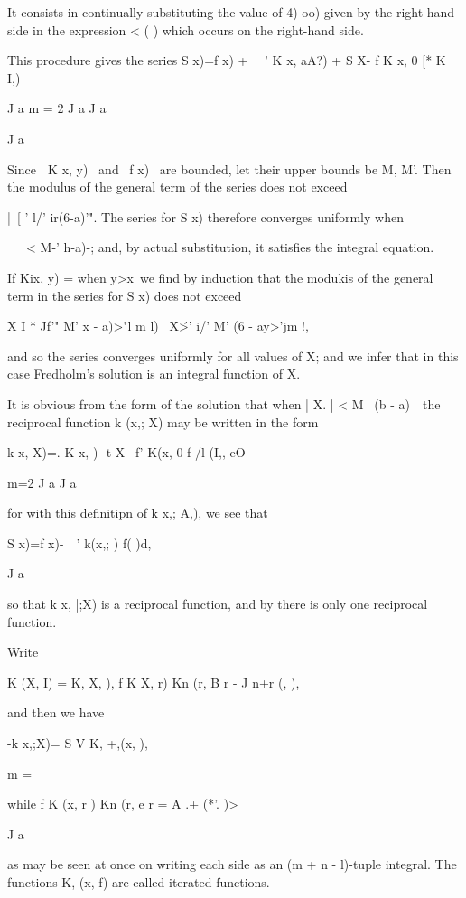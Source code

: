 {%
%

It consists in continually substituting the value of 4) oo) given by
the right-hand side in the expression < ( ) which occurs on the
right-hand side.

This procedure gives the series S x)=f x) + \ \ ' K x, aA?) + S X- f K
x, 0 [* K I,)

J a m = 2 J a J a

J a

Since | K x, y) \ and \ f x) \ are bounded, let their upper bounds be
M, M'. Then the modulus of the general term of the series does not
exceed

|\ [ ' l/' ir(6-a)'". The series for S x) therefore converges
uniformly when

\ \ \ < M-' h-a)-; and, by actual substitution, it satisfies the
integral equation.

If Kix, y) = when y>x\ we find by induction that the modukis of the
general term in the series for S x) does not exceed

X I * Jf'" M' x - a)>"l m l) \ X\'>' i/' M' (6 - ay>'jm !,

and so the series converges uniformly for all values of X; and we
infer that in this case Fredholm's solution is an integral function of
X.

It is obvious from the form of the solution that when | X. | < M~ (b -
a)~\ the reciprocal function k (x,; X) may be written in the form

k x, X)=.-K x, )- t X-- f' K(x, 0 f /l (I,, eO

m=2 J a J a

for with this definitipn of k x,; A,), we see that

S x)=f x)-\ \ ' k(x,; ) f( )d,

J a

so that k x, |;X) is a reciprocal function, and by there is
only one reciprocal function.

Write

K (X, I) = K, X, ), f K X, r) Kn (r, B r - J n+r (, ),

and then we have

-k x,;X)= S V K, +,(x, ),

m =

while f K (x, r ) Kn (r, e r = A .+ (*'. )>

J a

as may be seen at once on writing each side as an (m + n - l)-tuple
integral. The functions K, (x, f) are called iterated functions.

}
